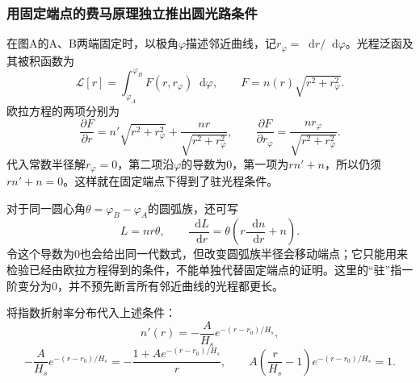 \documentclass[UTF8,fontset=fandol,a4paper,11pt]{ctexart}
\newcommand{\dd}{\mathop{}\!\mathrm{d}}
\begin{document}
\subsubsection*{用固定端点的费马原理独立推出圆光路条件}
在图A的A、B两端固定时，以极角$\varphi$描述邻近曲线，记$r_\varphi=\dd r/\dd\varphi$。光程泛函及其被积函数为
\[
\mathcal L[r]=\int_{\varphi_A}^{\varphi_B}
F(r,r_\varphi)\dd\varphi,\qquad
F=n(r)\sqrt{r^2+r_\varphi^2}.
\]
欧拉方程的两项分别为
\[
\frac{\partial F}{\partial r}
=n'\sqrt{r^2+r_\varphi^2}
+\frac{nr}{\sqrt{r^2+r_\varphi^2}},\qquad
\frac{\partial F}{\partial r_\varphi}
=\frac{nr_\varphi}{\sqrt{r^2+r_\varphi^2}}.
\]
代入常数半径解$r_\varphi=0$，第二项沿$\varphi$的导数为0，第一项为$rn'+n$，所以仍须$rn'+n=0$。这样就在固定端点下得到了驻光程条件。

对于同一圆心角$\theta=\varphi_B-\varphi_A$的圆弧族，还可写
\[
L=nr\theta,\qquad
\frac{\dd L}{\dd r}
=\theta\left(r\frac{\dd n}{\dd r}+n\right).
\]
令这个导数为0也会给出同一代数式，但改变圆弧族半径会移动端点；它只能用来检验已经由欧拉方程得到的条件，不能单独代替固定端点的证明。这里的“驻”指一阶变分为0，并不预先断言所有邻近曲线的光程都更长。

将指数折射率分布代入上述条件：
\[
n'(r)=-\frac{A}{H_s}e^{-(r-r_0)/H_s},
\]
\[
-\frac{A}{H_s}e^{-(r-r_0)/H_s}
=-\frac{1+A e^{-(r-r_0)/H_s}}r,
\qquad
A\left(\frac r{H_s}-1\right)e^{-(r-r_0)/H_s}=1.
\]
\end{document}
